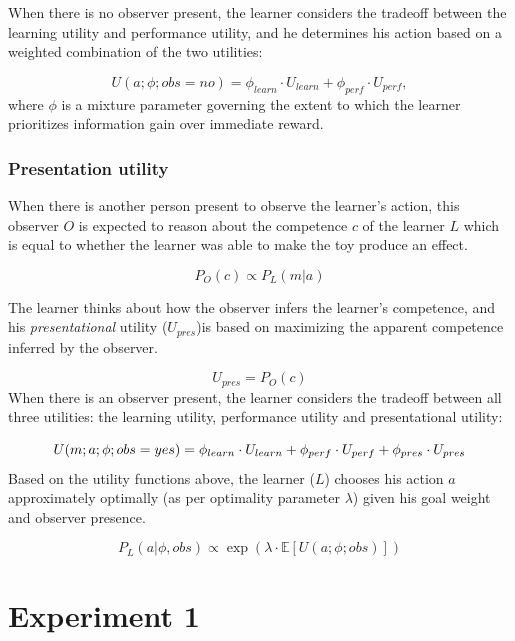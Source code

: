 \documentclass[10pt, letterpaper]{article}
\begin{document}
When there is no observer present, the learner considers the tradeoff
between the learning utility and performance utility, and he determines
his action based on a weighted combination of the two utilities:

\[ U(a;\phi; obs = no) = \phi_{learn} \cdot U_{learn} + \phi_{perf} \cdot U_{perf} ,\]
\noindent
where \(\phi\) is a mixture parameter governing the extent to which the
learner prioritizes information gain over immediate reward.

\subsubsection{Presentation utility}\label{presentation-utility}

When there is another person present to observe the learner's action,
this observer \(O\) is expected to reason about the competence \(c\) of
the learner \(L\) which is equal to whether the learner was able to make
the toy produce an effect.

\[ P_O(c) \propto P_L(m | a)\]

The learner thinks about how the observer infers the learner's
competence, and his \emph{presentational} utility (\(U_{pres}\))is based
on maximizing the apparent competence inferred by the observer.

\[ U_{pres} = P_O(c) \] When there is an observer present, the learner
considers the tradeoff between all three utilities: the learning
utility, performance utility and presentational utility:

\[ U(m;a;\phi; obs = yes) = \phi_{learn} \cdot U_{learn} + \\ \phi_{perf} \cdot U_{perf} + \phi_{pres} \cdot U_{pres}\]
Based on the utility functions above, the learner (\(L\)) chooses his
action \(a\) approximately optimally (as per optimality parameter
\(\lambda\)) given his goal weight and observer presence.

\[ P_L(a | \phi, obs) \propto \exp(\lambda \cdot \mathbb{E}[U(a;\phi; obs)])\]

\section{Experiment 1}\label{experiment-1}
\end{document}
